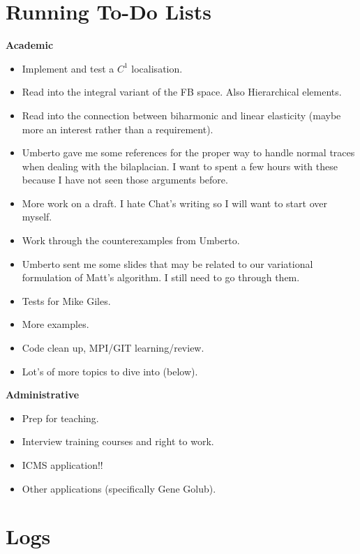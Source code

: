\documentclass[12pt,a4paper]{article}
\begin{document}
\newpage


\section{Running To-Do Lists}

\textbf{Academic}

\begin{itemize}
    \item Implement and test a $C^1$ localisation.
    \item Read into the integral variant of the FB space. Also Hierarchical elements. 
    \item Read into the connection between biharmonic and linear elasticity (maybe more an interest rather than a requirement). 
    \item Umberto gave me some references for the proper way to handle normal traces when dealing with the bilaplacian. I want to spent a few hours with these because I have not seen those arguments before. 
    \item More work on a draft. I hate Chat's writing so I will want to start over myself. 
    \item Work through the counterexamples from Umberto. 
    \item Umberto sent me some slides that may be related to our variational formulation of Matt's algorithm. I still need to go through them. 
    \item Tests for Mike Giles.
    \item More examples. 
    \item Code clean up, MPI/GIT learning/review. 
    \item Lot's of more topics to dive into (below). 
\end{itemize}

\textbf{Administrative}

\begin{itemize}
    \item Prep for teaching.
    \item Interview training courses and right to work. 
    \item ICMS application!!
    \item Other applications (specifically Gene Golub). 
\end{itemize}





\newpage
\section{Logs}
\end{document}
